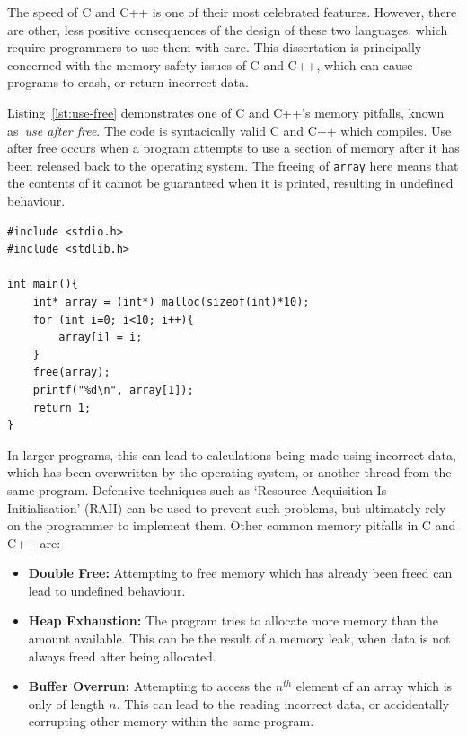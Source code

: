 The speed of C and C++ is one of their most celebrated features. However, there are other, less positive consequences of the design of these two languages, which require programmers to use them with care. This dissertation is principally concerned with the memory safety issues of C and C++, which can cause programs to crash, or return incorrect data.

Listing~\ref{lst:use-free} demonstrates one of C and C++'s memory pitfalls, known as~{\em use after free}. The code is syntacically valid C and C++ which compiles. Use after free occurs when a program attempts to use a section of memory after it has been released back to the operating system.
The freeing of \texttt{array} here means that the contents of it cannot be guaranteed when it is printed, resulting in undefined behaviour.

\begin{code}
\begin{verbatim}
#include <stdio.h>
#include <stdlib.h>

int main(){
    int* array = (int*) malloc(sizeof(int)*10);
    for (int i=0; i<10; i++){
        array[i] = i;
    }
    free(array);
    printf("%d\n", array[1]);
    return 1;
}
\end{verbatim}
\label{lst:use-free}
\end{code}

In larger programs, this can lead to calculations being made using incorrect data, which has been overwritten by the operating system, or another thread from the same program. Defensive techniques such as `Resource Acquisition Is Initialisation' (RAII) can be used to prevent such problems, but ultimately rely on the programmer to implement them.
Other common memory pitfalls in C and C++ are:

\begin{itemize}
    \item \textbf{Double Free:} Attempting to free memory which has already been freed can lead to undefined behaviour.
    \item \textbf{Heap Exhaustion:} The program tries to allocate more memory than the amount available. This can be the result of a memory leak, when data is not always freed after being allocated.
    \item \textbf{Buffer Overrun:} Attempting to access the $n^{th}$ element of an array which is only of length $n$. This can lead to the reading incorrect data, or accidentally corrupting other memory within the same program.
\end{itemize}


